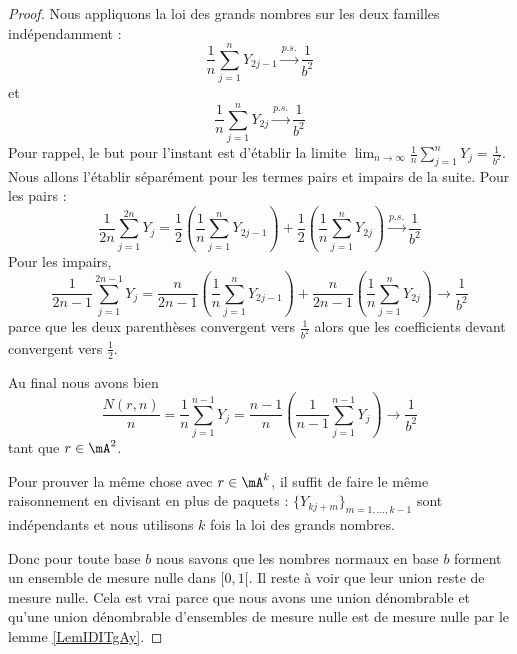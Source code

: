 \begin{proof}
    Nous appliquons la loi des grands nombres sur les deux familles indépendamment :
    \begin{equation}
        \frac{1}{ n }\sum_{j=1}^nY_{2j-1}\stackrel{p.s.}{\longrightarrow}\frac{1}{ b^2 }
    \end{equation}
    et 
    \begin{equation}
        \frac{1}{ n }\sum_{j=1}^nY_{2j}\stackrel{p.s.}{\longrightarrow}\frac{1}{ b^2 }
    \end{equation}
    Pour rappel, le but pour l'instant est d'établir la limite \( \lim_{n\to \infty} \frac{1}{ n }\sum_{j=1}^nY_j=\frac{1}{ b^2 }\). Nous allons l'établir séparément pour les termes pairs et impairs de la suite. Pour les pairs :
    \begin{equation}
        \frac{1}{ 2n }\sum_{j=1}^{2n}Y_j=\frac{ 1 }{2}\left( \frac{1}{ n }\sum_{j=1}^nY_{2j-1} \right)+\frac{ 1 }{2}\left( \frac{1}{ n }\sum_{j=1}^nY_{2j} \right)\stackrel{p.s.}{\longrightarrow}\frac{1}{ b^2 }
    \end{equation}
    Pour les impairs,
    \begin{equation}
        \frac{1}{ 2n-1 }\sum_{j=1}^{2n-1}Y_j=\frac{ n }{ 2n-1 }\left( \frac{1}{ n }\sum_{j=1}^nY_{2j-1} \right)+\frac{ n }{ 2n-1 }\left( \frac{1}{ n }\sum_{j=1}^nY_{2j} \right)\to\frac{1}{ b^2 }
    \end{equation}
    parce que les deux parenthèses convergent vers \( \frac{1}{ b^2 }\) alors que les coefficients devant convergent vers \( \frac{ 1 }{2}\).

    Au final nous avons bien
    \begin{equation}
        \frac{ N(r,n) }{ n }=\frac{1}{ n }\sum_{j=1}^{n-1}Y_j=\frac{ n-1 }{ n }\left( \frac{1}{ n-1 }\sum_{j=1}^{n-1}Y_j \right)\to\frac{1}{ b^2 }
    \end{equation}
    tant que \( r\in\mA^2\).

    Pour prouver la même chose avec \( r\in \mA^k\), il suffit de faire le même raisonnement en divisant en plus de paquets : \( \{ Y_{kj+m} \}_{m=1,\ldots, k-1}\) sont indépendants et nous utilisons \( k\) fois la loi des grands nombres.

    Donc pour toute base \( b\) nous savons que les nombres normaux en base \( b\) forment un ensemble de mesure nulle dans \( \mathopen[ 0 , 1 [\). Il reste à voir que leur union reste de mesure nulle. Cela est vrai parce que nous avons une union dénombrable et qu'une union dénombrable d'ensembles de mesure nulle est de mesure nulle par le lemme \ref{LemIDITgAy}.
\end{proof}

